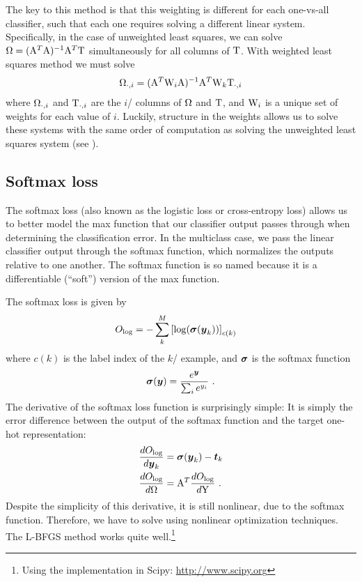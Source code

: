 The key to this method is that this weighting is different
for each one-vs-all classifier,
such that each one requires solving a different linear system.
Specifically,
in the case of unweighted least squares,
we can solve
$\Omega = (\mathrm{A}^T \mathrm{A})^{-1} \mathrm{A}^T \mathrm{T}$
simultaneously for all columns of $\mathrm{T}$.
With weighted least squares method we must solve
\begin{align}
  \Omega_{\cdot,i} = (\mathrm{A}^T \mathrm{W}_i \mathrm{A})^{-1} \mathrm{A}^T \mathrm{W}_k \mathrm{T}_{\cdot,i}
\end{align}
where $\Omega_{\cdot,i}$ and $\mathrm{T}_{\cdot,i}$ are the $i$\sth/ columns of $\Omega$ and $\mathrm{T}$,
and $\mathrm{W}_i$ is a unique set of weights for each value of $i$.
Luckily, structure in the weights allows us to solve these systems
with the same order of computation
as solving the unweighted least squares system (see ).


\subsection{Softmax loss}

The softmax loss (also known as the logistic loss or cross-entropy loss)
allows us to better model the max function that our classifier output
passes through when determining the classification error.
In the multiclass case,
we pass the linear classifier output through the softmax function,
which normalizes the outputs relative to one another.
The softmax function is so named because it is a
differentiable (``soft'') version of the max function.

The softmax loss is given by
\begin{align}
  O_\text{log} &= -\sum_k^M \left[\log (\boldsymbol{\sigma}(\boldsymbol{y}_k))\right]_{c(k)}
\end{align}
where $c(k)$ is the label index of the $k$\sth/ example,
and $\boldsymbol{\sigma}$ is the softmax function
\begin{align}
  \boldsymbol{\sigma}(\boldsymbol{y}) = \frac{e^{\boldsymbol{y}}}{\sum_i e^{y_i}} \text{ .}
\end{align}
The derivative of the softmax loss function is surprisingly simple:
It is simply the error difference between the output of the softmax function
and the target one-hot representation:
\begin{align}
  \frac{dO_\text{log}}{d\boldsymbol{y}_k} &= \boldsymbol{\sigma}(\boldsymbol{y}_k) - \boldsymbol{t}_k \\
  \frac{dO_\text{log}}{d\Omega} &= \mathrm{A}^T \frac{dO_\text{log}}{d\mathrm{Y}} \text{ .}
\end{align}
Despite the simplicity of this derivative,
it is still nonlinear, due to the softmax function.
Therefore, we have to solve using nonlinear optimization techniques.
The L-BFGS method \parencite{Liu1989} works quite well.\footnote{
  Using the implementation in Scipy: \url{http://www.scipy.org}}

